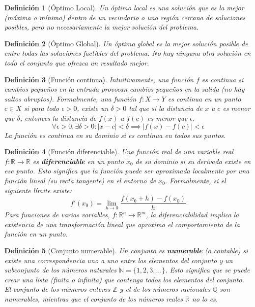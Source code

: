 \documentclass[12pt,a4paper]{book}
\newtheorem{defi}{Definición}[section]
\begin{document}
\begin{defi}[Óptimo Local]
\label{def:optimo_local}
Un óptimo local es una solución que es la mejor (máxima o mínima) dentro de un vecindario o una región cercana de soluciones posibles,
pero no necesariamente la mejor solución del problema.
\end{defi}

\begin{defi}[Óptimo Global]
\label{def:optimo_global}
Un óptimo global es la mejor solución posible de entre todas las soluciones factibles del problema.
No hay ninguna otra solución en todo el conjunto que ofrezca un resultado mejor.

\end{defi}


\begin{defi}[Función continua]
\label{def:fun_continua}
Intuitivamente, una función $f$ es continua si cambios pequeños en la entrada provocan cambios pequeños en la salida (no hay saltos abruptos). Formalmente, una función $f: X \to Y$ es continua en un punto $c \in X$ si para todo $\epsilon > 0$, existe un $\delta > 0$ tal que si la distancia de $x$ a $c$ es menor que $\delta$, entonces la distancia de $f(x)$ a $f(c)$ es menor que $\epsilon$.
$$ \forall \epsilon > 0, \exists \delta > 0 : |x-c| < \delta \implies |f(x)-f(c)| < \epsilon $$
La función es continua en su dominio si es continua en todos sus puntos.
\end{defi}

\begin{defi}[Función diferenciable]
    \label{def:fun_diferenciable}
Una función real de una variable real $f: \mathbb{R} \to \mathbb{R}$ es \textbf{diferenciable} en un punto $x_0$ de su dominio si su derivada existe en ese punto. Esto significa que la función puede ser aproximada localmente por una función lineal (su recta tangente) en el entorno de $x_0$. Formalmente, si el siguiente límite existe:
$$ f'(x_0) = \lim_{h \to 0} \frac{f(x_0+h) - f(x_0)}{h} $$
Para funciones de varias variables, $f: \mathbb{R}^n \to \mathbb{R}^m$, la diferenciabilidad implica la existencia de una transformación lineal  que aproxima el comportamiento de la función en un punto.
\end{defi}

\begin{defi}[Conjunto numerable]
\label{def:conjunto_numerable}
Un conjunto es \textbf{numerable} (o contable) si existe una correspondencia uno a uno entre los elementos del conjunto y un subconjunto de los números naturales $\mathbb{N} = \{1, 2, 3, \dots\}$. Esto significa que se puede crear una lista (finita o infinita) que contenga todos los elementos del conjunto. El conjunto de los números enteros $\mathbb{Z}$ y el de los números racionales $\mathbb{Q}$ son numerables, mientras que el conjunto de los números reales $\mathbb{R}$ no lo es.
\end{defi}
\end{document}
